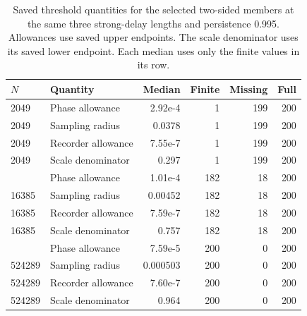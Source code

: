 \begingroup\small\setlength{\tabcolsep}{4pt}
\begin{longtable}{@{}llrrrr@{}}
\caption{Saved threshold quantities for the selected two-sided members at the same three strong-delay lengths and persistence 0.995. Allowances use saved upper endpoints. The scale denominator uses its saved lower endpoint. Each median uses only the finite values in its row.}\label{tab:src16:threshold-examples}\\
\toprule
$N$ & Quantity & Median & Finite & Missing & Full \\\midrule\endhead
2049 & Phase allowance & 2.92e-4 & 1 & 199 & 200 \\
2049 & Sampling radius & 0.0378 & 1 & 199 & 200 \\
2049 & Recorder allowance & 7.55e-7 & 1 & 199 & 200 \\
2049 & Scale denominator & 0.297 & 1 & 199 & 200 \\
\addlinespace
16385 & Phase allowance & 1.01e-4 & 182 & 18 & 200 \\
16385 & Sampling radius & 0.00452 & 182 & 18 & 200 \\
16385 & Recorder allowance & 7.59e-7 & 182 & 18 & 200 \\
16385 & Scale denominator & 0.757 & 182 & 18 & 200 \\
\addlinespace
524289 & Phase allowance & 7.59e-5 & 200 & 0 & 200 \\
524289 & Sampling radius & 0.000503 & 200 & 0 & 200 \\
524289 & Recorder allowance & 7.60e-7 & 200 & 0 & 200 \\
524289 & Scale denominator & 0.964 & 200 & 0 & 200 \\
\bottomrule\end{longtable}
\endgroup
